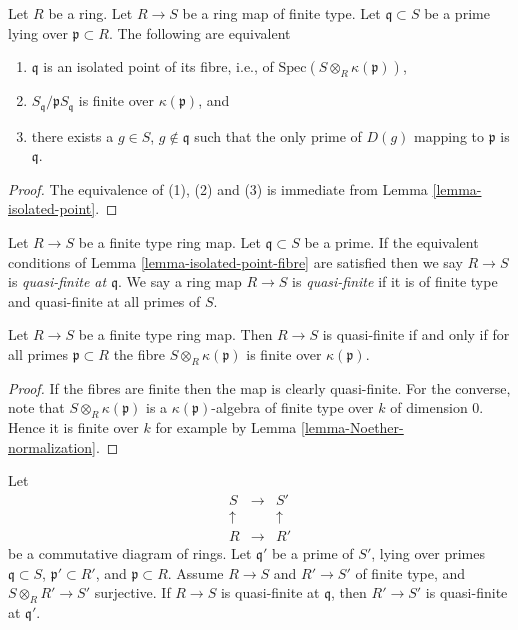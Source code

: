 \begin{lemma}
\label{lemma-isolated-point-fibre}
Let $R$ be a ring.
Let $R \to S$ be a ring map of finite type.
Let $\mathfrak q \subset S$ be a prime lying over
$\mathfrak p \subset R$. The following are equivalent
\begin{enumerate}
\item $\mathfrak q$ is an isolated point of
its fibre, i.e., of $\text{Spec}(S \otimes_R \kappa(\mathfrak p))$,
\item $S_{\mathfrak q}/\mathfrak pS_{\mathfrak q}$ is finite over
$\kappa(\mathfrak p)$, and
\item there exists a $g \in S$, $g \not \in \mathfrak q$ such that
the only prime of $D(g)$ mapping to $\mathfrak p$
is $\mathfrak q$.
\end{enumerate}
\end{lemma}

\begin{proof}
The equivalence of (1), (2) and (3) is immediate from
Lemma \ref{lemma-isolated-point}.
\end{proof}

\begin{definition}
\label{definition-quasi-finite}
Let $R \to S$ be a finite type ring map.
Let $\mathfrak q \subset S$ be a prime.
If the equivalent conditions of Lemma \ref{lemma-isolated-point-fibre}
are satisfied then we say $R \to S$ is {\it quasi-finite at $\mathfrak q$}.
We say a ring map $R \to S$ is {\it quasi-finite}
if it is of finite type and quasi-finite at all primes of $S$.
\end{definition}

\begin{lemma}
\label{lemma-quasi-finite}
Let $R \to S$ be a finite type ring map.
Then $R \to S$ is quasi-finite if and only if for all
primes $\mathfrak p \subset R$
the fibre $S \otimes_R \kappa(\mathfrak p)$ is finite
over $\kappa(\mathfrak p)$.
\end{lemma}

\begin{proof}
If the fibres are finite then the map is clearly quasi-finite.
For the converse, note that $S \otimes_R \kappa(\mathfrak p)$
is a $\kappa(\mathfrak p)$-algebra of finite type over
$k$ of dimension $0$. Hence it is finite over $k$ for example
by Lemma \ref{lemma-Noether-normalization}.
\end{proof}

\begin{lemma}
\label{lemma-four-rings}
Let
$$
\begin{matrix}
S & \to & S' \\
\uparrow & & \uparrow \\
R & \to & R'
\end{matrix}
$$
be a commutative diagram of rings.
Let $\mathfrak q'$ be a prime of $S'$, lying over primes
$\mathfrak q \subset S$, $\mathfrak p' \subset R'$, and
$\mathfrak p \subset R$. Assume $R \to S$ and $R' \to S'$
of finite type, and $S \otimes_R R' \to S'$ surjective.
If $R \to S$ is quasi-finite at $\mathfrak q$, then
$R' \to S'$ is quasi-finite at $\mathfrak q'$.
\end{lemma}

